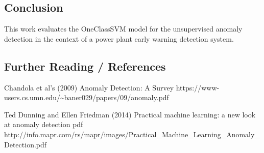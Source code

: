 \documentclass[11pt]{article}
\begin{document}
    \subsection{Conclusion}\label{conclusion}

This work evaluates the OneClassSVM model for the unsupervised anomaly
detection in the context of a power plant early warning detection
system.

\subsection{Further Reading /
References}\label{further-reading-references}

Chandola et al's (2009) Anomaly Detection: A Survey
https://www-users.cs.umn.edu/\textasciitilde{}baner029/papers/09/anomaly.pdf

Ted Dunning and Ellen Friedman (2014) Practical machine learning: a new
look at anomaly detection pdf
http://info.mapr.com/rs/mapr/images/Practical\_Machine\_Learning\_Anomaly\_Detection.pdf


    
    
    
    
\end{document}
